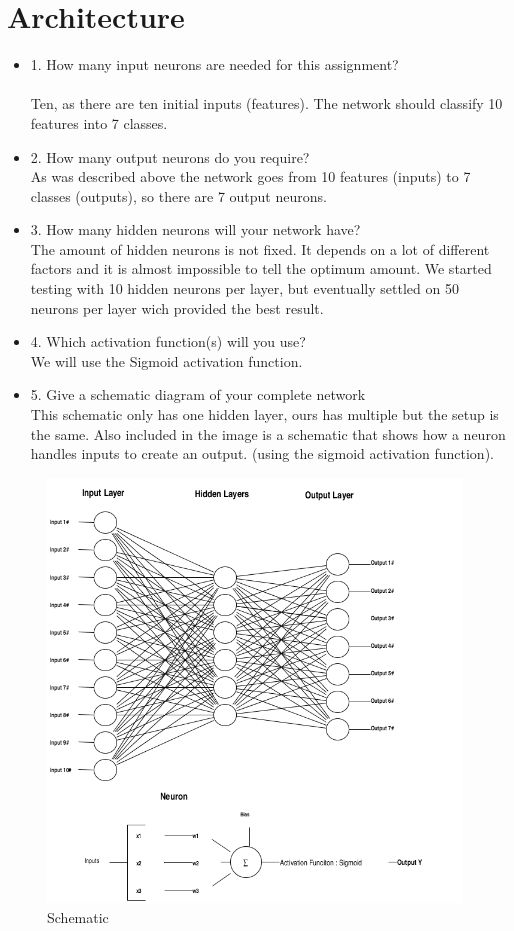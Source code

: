 
\section{Architecture} \label {chapter:architecture}
\begin{itemize}
\item 1. How many input neurons are needed for this assignment?\\\\
Ten, as there are ten initial inputs (features). The network should classify 10 features into 7 classes.
\item 2. How many output neurons do you require?\\
As was described above the network goes from 10 features (inputs) to 7 classes (outputs), so there are 7 output neurons.
\item 3. How many hidden neurons will your network have?\\
The amount of hidden neurons is not fixed. It depends on a lot of different factors and it is almost impossible to tell the optimum amount. We started testing with 10 hidden neurons per layer, but eventually settled on 50 neurons per layer wich provided the best result.
\item 4. Which activation function(s) will you use?\\
We will use the Sigmoid activation function.
\item 5. Give a schematic diagram of your complete network\\
This schematic only has one hidden layer, ours has multiple but the setup is the same. Also included in the image is a schematic that shows how a neuron handles inputs to create an output.
(using the sigmoid activation function).
\end{itemize}

\begin{figure}[!h]
\begin{center}
\includegraphics[width=11cm]{images/schemeit-project.png}
\caption{Schematic }
\label{schematic}
\end{center}
\end{figure}
\FloatBarrier

